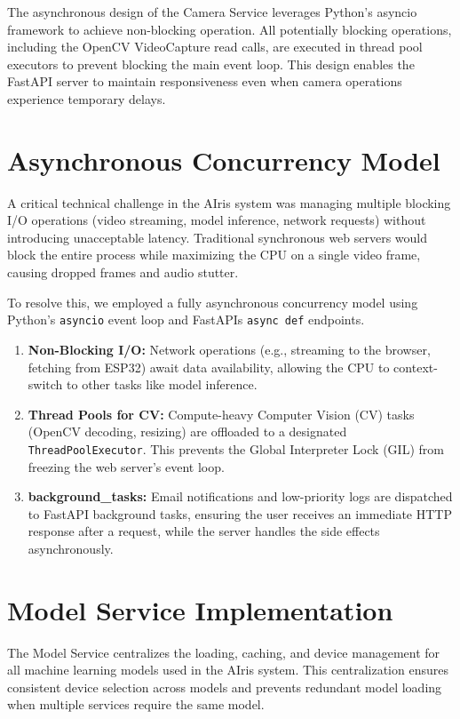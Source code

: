 \documentclass[12pt,a4paper]{report}
\begin{document}
The asynchronous design of the Camera Service leverages Python's asyncio framework to achieve non-blocking operation. All potentially blocking operations, including the OpenCV VideoCapture read calls, are executed in thread pool executors to prevent blocking the main event loop. This design enables the FastAPI server to maintain responsiveness even when camera operations experience temporary delays.

\section{Asynchronous Concurrency Model}

A critical technical challenge in the AIris system was managing multiple blocking I/O operations (video streaming, model inference, network requests) without introducing unacceptable latency. Traditional synchronous web servers would block the entire process while maximizing the CPU on a single video frame, causing dropped frames and audio stutter.

To resolve this, we employed a fully asynchronous concurrency model using Python's \texttt{asyncio} event loop and FastAPIs \texttt{async def} endpoints.
\begin{enumerate}
    \item \textbf{Non-Blocking I/O:} Network operations (e.g., streaming to the browser, fetching from ESP32) await data availability, allowing the CPU to context-switch to other tasks like model inference.
    \item \textbf{Thread Pools for CV:} Compute-heavy Computer Vision (CV) tasks (OpenCV decoding, resizing) are offloaded to a designated \texttt{ThreadPoolExecutor}. This prevents the Global Interpreter Lock (GIL) from freezing the web server's event loop.
    \item \textbf{background\_tasks:} Email notifications and low-priority logs are dispatched to FastAPI background tasks, ensuring the user receives an immediate HTTP response after a request, while the server handles the side effects asynchronously.
\end{enumerate}

\section{Model Service Implementation}

The Model Service centralizes the loading, caching, and device management for all machine learning models used in the AIris system. This centralization ensures consistent device selection across models and prevents redundant model loading when multiple services require the same model.
\end{document}
